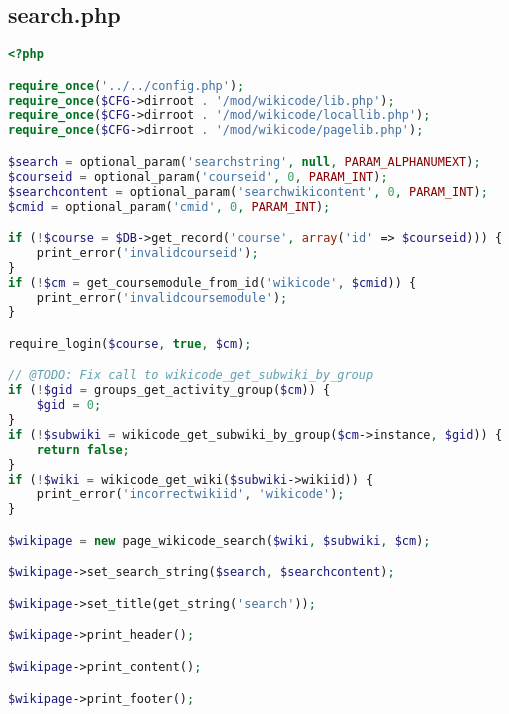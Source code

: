 \subsection{search.php}
\begin{lstlisting}[language=PHP]
<?php

require_once('../../config.php');
require_once($CFG->dirroot . '/mod/wikicode/lib.php');
require_once($CFG->dirroot . '/mod/wikicode/locallib.php');
require_once($CFG->dirroot . '/mod/wikicode/pagelib.php');

$search = optional_param('searchstring', null, PARAM_ALPHANUMEXT);
$courseid = optional_param('courseid', 0, PARAM_INT);
$searchcontent = optional_param('searchwikicontent', 0, PARAM_INT);
$cmid = optional_param('cmid', 0, PARAM_INT);

if (!$course = $DB->get_record('course', array('id' => $courseid))) {
    print_error('invalidcourseid');
}
if (!$cm = get_coursemodule_from_id('wikicode', $cmid)) {
    print_error('invalidcoursemodule');
}

require_login($course, true, $cm);

// @TODO: Fix call to wikicode_get_subwiki_by_group
if (!$gid = groups_get_activity_group($cm)) {
    $gid = 0;
}
if (!$subwiki = wikicode_get_subwiki_by_group($cm->instance, $gid)) {
    return false;
}
if (!$wiki = wikicode_get_wiki($subwiki->wikiid)) {
    print_error('incorrectwikiid', 'wikicode');
}

$wikipage = new page_wikicode_search($wiki, $subwiki, $cm);

$wikipage->set_search_string($search, $searchcontent);

$wikipage->set_title(get_string('search'));

$wikipage->print_header();

$wikipage->print_content();

$wikipage->print_footer();
\end{lstlisting}
